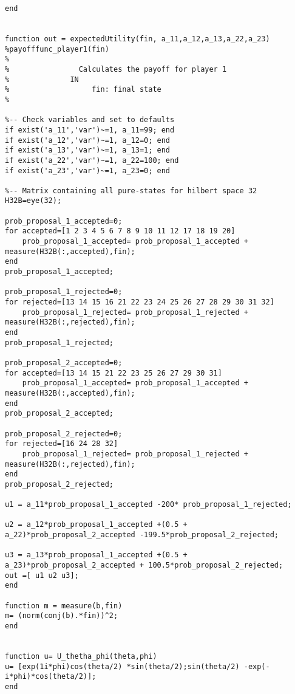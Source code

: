 \begin{lstlisting}
end


function out = expectedUtility(fin, a_11,a_12,a_13,a_22,a_23)
%payofffunc_player1(fin)
%
%                Calculates the payoff for player 1
%              IN
%                   fin: final state
%

%-- Check variables and set to defaults
if exist('a_11','var')~=1, a_11=99; end
if exist('a_12','var')~=1, a_12=0; end
if exist('a_13','var')~=1, a_13=1; end
if exist('a_22','var')~=1, a_22=100; end
if exist('a_23','var')~=1, a_23=0; end

%-- Matrix containing all pure-states for hilbert space 32
H32B=eye(32);

prob_proposal_1_accepted=0;
for accepted=[1 2 3 4 5 6 7 8 9 10 11 12 17 18 19 20]
    prob_proposal_1_accepted= prob_proposal_1_accepted + measure(H32B(:,accepted),fin);
end
prob_proposal_1_accepted;

prob_proposal_1_rejected=0;
for rejected=[13 14 15 16 21 22 23 24 25 26 27 28 29 30 31 32]
    prob_proposal_1_rejected= prob_proposal_1_rejected + measure(H32B(:,rejected),fin);
end
prob_proposal_1_rejected;

prob_proposal_2_accepted=0;
for accepted=[13 14 15 21 22 23 25 26 27 29 30 31]
    prob_proposal_1_accepted= prob_proposal_1_accepted + measure(H32B(:,accepted),fin);
end
prob_proposal_2_accepted;

prob_proposal_2_rejected=0;
for rejected=[16 24 28 32]
    prob_proposal_1_rejected= prob_proposal_1_rejected + measure(H32B(:,rejected),fin);
end
prob_proposal_2_rejected;

u1 = a_11*prob_proposal_1_accepted -200* prob_proposal_1_rejected;

u2 = a_12*prob_proposal_1_accepted +(0.5 + a_22)*prob_proposal_2_accepted -199.5*prob_proposal_2_rejected;

u3 = a_13*prob_proposal_1_accepted +(0.5 + a_23)*prob_proposal_2_accepted + 100.5*prob_proposal_2_rejected;
out =[ u1 u2 u3];
end

function m = measure(b,fin)
m= (norm(conj(b).*fin))^2;
end


function u= U_thetha_phi(theta,phi)
u= [exp(1i*phi)cos(theta/2) *sin(theta/2);sin(theta/2) -exp(-i*phi)*cos(theta/2)];
end
\end{lstlisting}


